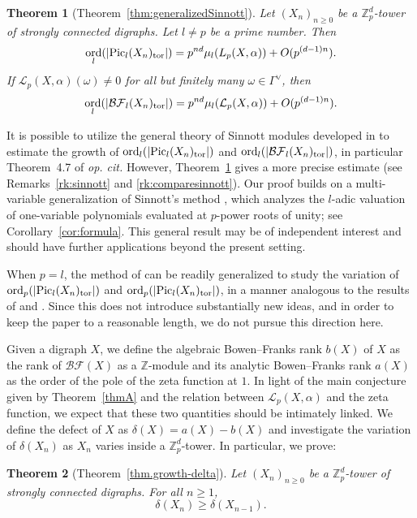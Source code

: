 \documentclass[11pt]{amsart}
\DeclareMathOperator{\ord}{ord}
\numberwithin{equation}{section}
\newtheorem{lthm}{Theorem} %
\theoremstyle{remark}
\newcommand{\?}{\stackrel{?}{=}}
\newcommand{\cL}{\mathcal{L}}
\newcommand{\ZZ}{\mathbb{Z}}
\newcommand{\Zp}{\mathbb{Z}_p}
\newcommand{\Z}{\mathbb{Z}}
\newcommand{\Pic}{\textup{Pic}}
\newcommand{\BF}{\mathcal{BF}}
\begin{document}
\begin{lthm}[Theorem~\ref{thm:generalizedSinnott}]\label{thmB}
       Let $(X_n)_{n\ge0}$ be a $\Zp^d$-tower of strongly connected digraphs.  Let $l\ne p$ be a prime number. Then 
    \[
    \ord_l(|\Pic_l(X_n)_\mathrm{tor}|)=p^{nd}\mu_l(L_p(X,\alpha))+O(p^{(d-1)n}).
    \] If $\mathcal{L}_p(X,\alpha)(\omega)\neq 0$ for all but finitely many $\omega\in\Gamma^\vee$, then
    \[\ord_l(\vert \BF_l(X_n)_{\textup{tor}}\vert)=p^{nd}\mu_l(\mathcal{L}_p(X,\alpha))+O(p^{(d-1)n}).\]
\end{lthm}
It is possible to utilize the general theory of Sinnott modules developed in \cite{BandiniLonghi} to estimate the growth of $\ord_l(|\Pic_l(X_n)_\mathrm{tor}|)$ and $\ord_l(\vert \BF_l(X_n)_{\textup{tor}}\vert)$, in particular Theorem~4.7 of \textit{op. cit.} However, Theorem~\ref{thmB} gives a more precise estimate (see Remarks~\ref{rk:sinnott} and \ref{rk:comparesinnott}). Our proof builds on a multi-variable generalization of Sinnott’s method \cite{sinnott}, which analyzes the $l$-adic valuation of one-variable polynomials evaluated at $p$-power roots of unity; see Corollary~\ref{cor:formula}. This general result may be of independent interest and should have further applications beyond the present setting.


When $p=l$, the method of \cite{cuoco-monsky} can be readily generalized to study the variation of $\ord_p(|\Pic_l(X_n)_\mathrm{tor}|)$ and $\ord_p(|\Pic_l(X_n)_\mathrm{tor}|)$, in a manner analogous to the results of \cite{DV} and \cite{KM1}. Since this does not introduce substantially new ideas, and in order to keep the paper to a reasonable length, we do not pursue this direction here.




Given a digraph $X$, we define the algebraic Bowen--Franks rank $b(X)$ of $X$ as the rank of $\BF(X)$ as a $\ZZ$-module and its analytic Bowen--Franks rank $a(X)$ as the order of the pole of the zeta function at $1$. In light of the main conjecture given by Theorem~\ref{thmA} and the relation between $\cL_p(X,\alpha)$ and the zeta function, we expect that these two quantities should be intimately linked. We define the defect of $X$ as $\delta(X)=a(X)-b(X)$ and investigate the variation of $\delta(X_n)$ as $X_n$ varies inside a $\Zp^d$-tower. In particular, we prove:

\begin{lthm}[Theorem~\ref{thm.growth-delta}]\label{thmC}
    Let $(X_n)_{n\ge 0}$ be a $\Z_p^d$-tower of strongly connected digraphs. For all $n\ge1$,
    \[\delta(X_n)\ge \delta(X_{n-1}).\]    
\end{lthm}
\end{document}
